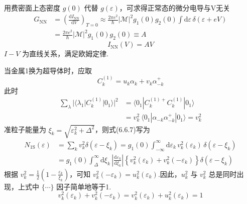 用费密面上态密度 $g(0)$ 代替 $g(\varepsilon)$，可求得正常态的微分电导与V无关
\begin{equation}
\begin{aligned}
  G_{\mathrm{NN}}&=\left(\frac{\mathrm{d}I_{\mathrm{NN}}}{\mathrm{d}V}\right)_{T=0}
  \approx\frac{2\pi e^{2}}{\hbar}|\mathscr{M}|^{2}
  g_{1}(0)g_{2}(0)\int\mathrm{d}\varepsilon\,\delta\left(\varepsilon+eV\right)\\
  &=\frac{2\pi e^{2}}{\hbar}|\mathscr{M}|^{2}g_{1}(0)g_{2}(0)\equiv A
\end{aligned}
\end{equation}
\begin{equation}
  I_{\mathrm{NN}}(V)=AV
\end{equation}
$I-V$ 为直线关系，满足欧姆定律.

当金属1换为超导体时，应取
\begin{equation*}
  C^{(1)}_{k}=u_{k}\alpha_{k}+v_{k}\alpha^{+}_{-k}
\end{equation*}
此时
\begin{equation}
\begin{aligned}
  \sum_{\lambda}|\langle\lambda_{1}|C^{(1)}_{k}|0_{1}\rangle|^{2}
  &=\langle0_{1}|C^{(1)+}_{k}C^{(1)}_{k}|0_{1}\rangle\\
  &=v_{k}^{2}\ \langle0_{1}|\alpha_{-k}\alpha^{+}_{-k}|0_{1}\rangle=v_{k}^{2}
\end{aligned}
\end{equation}
准粒子能量为 $\xi_{k}=\sqrt{\varepsilon_{k}^{2}+\Delta^{2}}$，则式(6.6.7)写为
\begin{equation*}
\begin{aligned}
  N_{1\mathrm{S}}(\varepsilon)
  &=\sum_{k}v_{k}^{2}\delta\left(\varepsilon-\xi_{k}\right)
  =g_{1}(0)\int_{-\infty}^{\infty}\mathrm{d}\varepsilon_{k}\,
  v_{k}^{2}(\varepsilon_{k})\,\delta\left(\varepsilon-\xi_{k}\right)\\
  &=g_{1}(0)\int_{\Delta}^{\infty}\mathrm{d}\xi_{k}\,
  \left|\frac{\mathrm{d}\varepsilon_{k}}{\mathrm{d}\xi_{k}}\right|
  \left\{v_{k}^{2}(\varepsilon_{k})+v_{k}^{2}(-\varepsilon_{k})\right\}
  \delta\left(\varepsilon-\xi_{k}\right)
\end{aligned}
\end{equation*}
根据 $v_{k}^{2}=\frac{1}{2}\left(1-\frac{\varepsilon_{k}}{\xi_{k}}\right)$，可知 $v_{k}^{2}(-\varepsilon_{k})=u_{k}^{2}(\varepsilon_{k})$.因此，$u_{k}^{2}$ 与 $v_{k}^{2}$ 总是同时出现，上式中 $\{\cdots\}$ 因子简单地等于1.
\begin{equation}
  v_{k}^{2}(\varepsilon_{k})+v_{k}^{2}(-\varepsilon_{k})
  =v_{k}^{2}(\varepsilon_{k})+u_{k}^{2}(\varepsilon_{k})=1
\end{equation}
